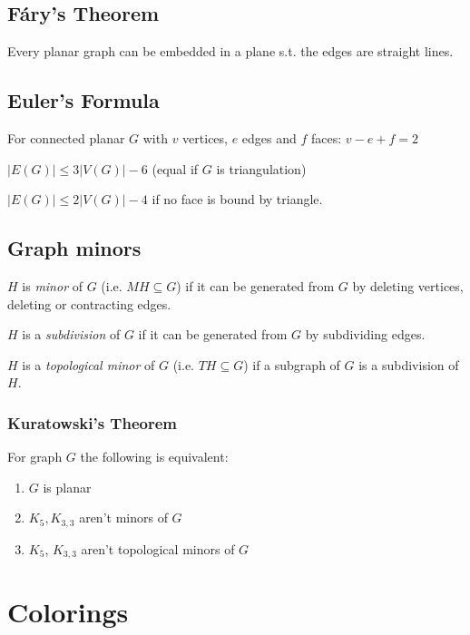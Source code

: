 \subsection*{F\'{a}ry's Theorem}

Every planar graph can be embedded in a plane s.t. the edges are straight lines.

\subsection*{Euler's Formula}

For connected planar $G$ with $v$ vertices, $e$ edges and $f$ faces: $v-e+f=2$

\spacing

$|E(G)| \leq 3|V(G)|-6$ (equal if $G$ is triangulation)

$|E(G)| \leq 2|V(G)|-4$ if no face is bound by triangle.

\subsection*{Graph minors}

$H$ is \emph{minor} of $G$ (i.e. $MH \subseteq G$) if it can be generated from $G$ by deleting vertices, deleting or contracting edges.

\spacing

$H$ is a \emph{subdivision} of $G$ if it can be generated from $G$ by subdividing edges.

\spacing

$H$ is a \emph{topological minor} of $G$ (i.e. $TH \subseteq G$) if a subgraph of $G$ is a subdivision of $H$.

\subsubsection*{Kuratowski's Theorem}

For graph $G$ the following is equivalent:

\begin{enumerate}[label=(\alph*)]
	\item $G$ is planar
	\item $K_5, K_{3,3}$ aren't minors of $G$
	\item $K_5$, $K_{3,3}$ aren't topological minors of $G$
\end{enumerate}


\section*{Colorings}

